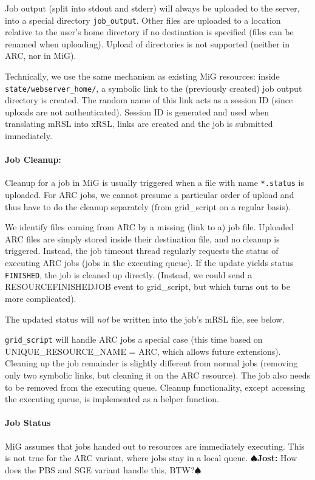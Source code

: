 \documentclass[11pt]{article}
\newcommand{\comm}[2]{{\scriptsize
    \(\spadesuit\){\bf #1: }{\rm \sf #2}\(\spadesuit\)}}
\newcommand{\jost}[1]{\comm{Jost}{#1}}
\begin{document}
 Job output (split into stdout and stderr) will always be uploaded to
 the server, into a special directory \verb!job_output!. Other files
 are uploaded to a location relative to the user's home directory if
 no destination is specified (files can be renamed when
 uploading). Upload of directories is not supported (neither in ARC,
 nor in MiG).

 Technically, we use the same mechanism as existing MiG resources: inside
 \texttt{state/webserver\_home/}, a symbolic link to the (previously
 created) job output directory is created. The random name of this
 link acts as a session ID (since uploads are not
 authenticated). Session ID is generated and used when translating
 mRSL into xRSL, links are created and the job is submitted immediately.

\paragraph{Job Cleanup:}
 Cleanup for a job in MiG is usually triggered when a file with name
 \verb!*.status! is uploaded. For ARC jobs, we cannot presume a
 particular order of upload and thus have to do the cleanup separately
 (from grid\_script on a regular basis).

 
 We identify files coming from ARC by a missing (link to a) job file.
 Uploaded ARC files are simply stored inside their destination file,
 and no cleanup is triggered. Instead, the job timeout thread
 regularly requests the status of executing ARC jobs (jobs in the
 executing queue).  If the update yields status \verb!FINISHED!, the
 job is cleaned up directly.  (Instead, we could send a
 RESOURCEFINISHEDJOB event to grid\_script, but which turns out to be
 more complicated). 

 The updated status will \emph{not} be written into the job's mRSL
 file, see below.

\verb!grid_script! will handle ARC jobs a special case (this time
based on UNIQUE\_RESOURCE\_NAME = ARC, which allows future
extensions).  Cleaning up the job remainder is slightly different from
normal jobs (removing only two symbolic links, but cleaning it on the
ARC resource). The job also needs to be removed from the executing
queue.  Cleanup functionality, except accessing the executing queue,
is implemented as a helper function.


\paragraph{Job Status}
 MiG assumes that jobs handed out to resources are immediately
 executing. This is not true for the ARC variant, where jobs stay in a
 local queue. \jost{How does the PBS and SGE variant handle this,
   BTW?}
\end{document}
